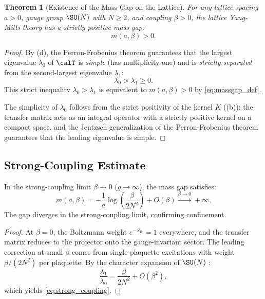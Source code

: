 \documentclass[12pt, a4paper]{article}
\theoremstyle{plain}
\newtheorem{theorem}{Theorem}[section]
\theoremstyle{definition}
\begin{document}
\begin{theorem}[Existence of the Mass Gap on the Lattice]\label{thm:massgap}
  For any lattice spacing $a > 0$, gauge group $\SU(N)$ with $N \geq 2$,
  and coupling $\beta > 0$, the lattice Yang-Mills theory has a strictly
  positive mass gap:
  \begin{equation}
    m(a, \beta) > 0.
  \end{equation}
\end{theorem}

\begin{proof}
  By (d), the Perron-Frobenius theorem guarantees that
  the largest eigenvalue $\lambda_0$ of $\calT$ is \emph{simple} (has
  multiplicity one) and is \emph{strictly separated} from the second-largest
  eigenvalue $\lambda_1$:
  \begin{equation}
    \lambda_0 > \lambda_1 \geq 0.
  \end{equation}
  This strict inequality $\lambda_0 > \lambda_1$ is equivalent to
  $m(a,\beta) > 0$ by \eqref{eq:massgap_def}.

  The simplicity of $\lambda_0$ follows from the strict positivity of
  the kernel $K$ ((b)): the transfer matrix acts as an
  integral operator with a strictly positive kernel on a compact space,
  and the Jentzsch generalization of the Perron-Frobenius theorem
  \citep{ReedSimon1975} guarantees that the leading eigenvalue is simple.
\end{proof}

\subsection{Strong-Coupling Estimate}

\begin{proposition}\label{prop:strong}
  In the strong-coupling limit $\beta \to 0$ ($g \to \infty$), the mass gap
  satisfies:
  \begin{equation}\label{eq:strong_coupling}
    m(a, \beta) = -\frac{1}{a}\log\!\left(\frac{\beta}{2N^2}\right) + O(\beta)
    \xrightarrow{\beta \to 0} +\infty.
  \end{equation}
  The gap diverges in the strong-coupling limit, confirming confinement.
\end{proposition}

\begin{proof}
  At $\beta = 0$, the Boltzmann weight $e^{-S_W} = 1$ everywhere, and the
  transfer matrix reduces to the projector onto the gauge-invariant sector.
  The leading correction at small $\beta$ comes from single-plaquette
  excitations with weight $\beta/(2N^2)$ per plaquette. By the character
  expansion of $\SU(N)$ \citep{CreutzBook, RotheBook}:
  \begin{equation}
    \frac{\lambda_1}{\lambda_0} = \frac{\beta}{2N^2} + O(\beta^2),
  \end{equation}
  which yields \eqref{eq:strong_coupling}.
\end{proof}
\end{document}
